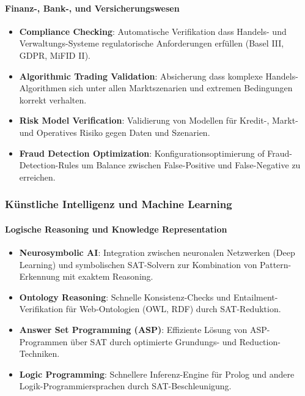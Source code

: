 ﻿\documentclass[a4paper,12pt]{article}
\theoremstyle{definition}
\begin{document}
\paragraph{Finanz-, Bank-, und Versicherungswesen}

\begin{itemize}
	\item \textbf{Compliance Checking}: Automatische Verifikation dass Handels- und Verwaltungs-Systeme regulatorische Anforderungen erfüllen (Basel III, GDPR, MiFID II).
	
	\item \textbf{Algorithmic Trading Validation}: Absicherung dass komplexe Handels-Algorithmen sich unter allen Marktszenarien und extremen Bedingungen korrekt verhalten.
	
	\item \textbf{Risk Model Verification}: Validierung von Modellen für Kredit-, Markt- und Operatives Risiko gegen Daten und Szenarien.
	
	\item \textbf{Fraud Detection Optimization}: Konfigurationsoptimierung of Fraud-Detection-Rules um Balance zwischen False-Positive und False-Negative zu erreichen.
\end{itemize}

\subsubsection{Künstliche Intelligenz und Machine Learning}

\paragraph{Logische Reasoning und Knowledge Representation}

\begin{itemize}
	\item \textbf{Neurosymbolic AI}: Integration zwischen neuronalen Netzwerken (Deep Learning) und symbolischen SAT-Solvern zur Kombination von Pattern-Erkennung mit exaktem Reasoning.
	
	\item \textbf{Ontology Reasoning}: Schnelle Konsistenz-Checks und Entailment-Verifikation für Web-Ontologien (OWL, RDF) durch SAT-Reduktion.
	
	\item \textbf{Answer Set Programming (ASP)}: Effiziente Lösung von ASP-Programmen über SAT durch optimierte Grundungs- und Reduction-Techniken.
	
	\item \textbf{Logic Programming}: Schnellere Inferenz-Engine für Prolog und andere Logik-Programmiersprachen durch SAT-Beschleunigung.
\end{itemize}
\end{document}
